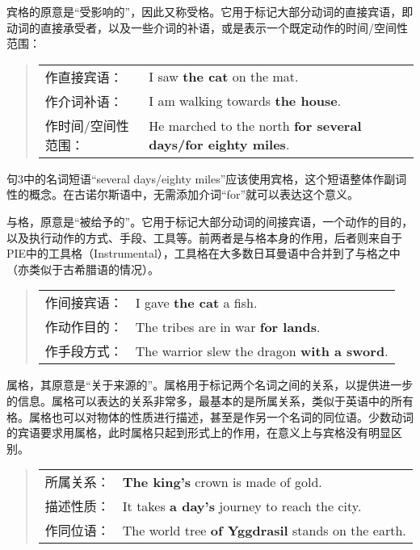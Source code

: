 宾格的原意是“受影响的”，因此又称受格。它用于标记大部分动词的直接宾语，即动词的直接承受者，以及一些介词的补语，或是表示一个既定动作的时间/空间性范围：

\begin{quote}
  \begin{tabular}{ll}
    作直接宾语：     & I saw \textbf{the cat} on the mat.                                  \\
    作介词补语：     & I am walking towards \textbf{the house}.                            \\
    作时间/空间性范围： & He marched to the north \textbf{for several days/for eighty miles}. \\
  \end{tabular}
\end{quote}
句3中的名词短语``several days/eighty miles''应该使用宾格，这个短语整体作副词性的概念。在古诺尔斯语中，无需添加介词``for''就可以表达这个意义。

与格，原意是“被给予的”。它用于标记大部分动词的间接宾语，一个动作的目的，以及执行动作的方式、手段、工具等。前两者是与格本身的作用，后者则来自于PIE中的工具格（Instrumental），工具格在大多数日耳曼语中合并到了与格之中（亦类似于古希腊语的情况）。
\begin{quote}
  \begin{tabular}{ll}
    作间接宾语： & I gave \textbf{the cat} a fish.                    \\
    作动作目的： & The tribes are in war \textbf{for lands}.          \\
    作手段方式： & The warrior slew the dragon \textbf{with a sword}. \\
  \end{tabular}
\end{quote}

属格，其原意是“关于来源的”。属格用于标记两个名词之间的关系，以提供进一步的信息。属格可以表达的关系非常多，最基本的是所属关系，类似于英语中的所有格。属格也可以对物体的性质进行描述，甚至是作另一个名词的同位语。少数动词的宾语要求用属格，此时属格只起到形式上的作用，在意义上与宾格没有明显区别。
\begin{quote}
  \begin{tabular}{ll}
    所属关系： & \textbf{The king's} crown is made of gold.                \\
    描述性质： & It takes \textbf{a day's} journey to reach the city.      \\
    作同位语： & The world tree \textbf{of Yggdrasil} stands on the earth. \\
  \end{tabular}
\end{quote}

